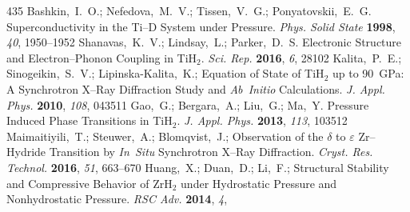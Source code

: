 \documentclass[12pt,letterpaper,oneside]{article}
\begin{document}
\begin{mcitethebibliography}{435}
{\mcitedefaultendpunct}{\mcitedefaultseppunct}\relax
\EndOfBibitem
{}
Bashkin,~I.~O.; Nefedova,~M.~V.; Tissen,~V.~G.; Ponyatovskii,~E.~G.
  Superconductivity in the Ti--D System under Pressure. \emph{Phys. Solid
  State} \textbf{1998}, \emph{40}, 1950--1952\relax
\mciteBstWouldAddEndPuncttrue
\mciteSetBstMidEndSepPunct{\mcitedefaultmidpunct}
{\mcitedefaultendpunct}{\mcitedefaultseppunct}\relax
\EndOfBibitem
{}
Shanavas,~K.~V.; Lindsay,~L.; Parker,~D.~S. Electronic Structure and
  Electron--Phonon Coupling in TiH$_2$. \emph{Sci. Rep.} \textbf{2016},
  \emph{6}, 28102\relax
\mciteBstWouldAddEndPuncttrue
\mciteSetBstMidEndSepPunct{\mcitedefaultmidpunct}
{\mcitedefaultendpunct}{\mcitedefaultseppunct}\relax
\EndOfBibitem
{}
Kalita,~P.~E.; Sinogeikin,~S.~V.; Lipinska-Kalita,~K.;
    Equation of State of TiH$_2$ up to 90~GPa: A Synchrotron
  X--Ray Diffraction Study and \emph{Ab~Initio} Calculations. \emph{J. Appl. Phys.}
  \textbf{2010}, \emph{108}, 043511\relax
\mciteBstWouldAddEndPuncttrue
\mciteSetBstMidEndSepPunct{\mcitedefaultmidpunct}
{\mcitedefaultendpunct}{\mcitedefaultseppunct}\relax
\EndOfBibitem
{}
Gao,~G.; Bergara,~A.; Liu,~G.; Ma,~Y. Pressure Induced Phase Transitions in
  TiH$_2$. \emph{J. Appl. Phys.} \textbf{2013}, \emph{113}, 103512\relax
\mciteBstWouldAddEndPuncttrue
\mciteSetBstMidEndSepPunct{\mcitedefaultmidpunct}
{\mcitedefaultendpunct}{\mcitedefaultseppunct}\relax
\EndOfBibitem
{}
Maimaitiyili,~T.; Steuwer,~A.; Blomqvist,~J.;
    Observation of the $\delta$ to $\varepsilon$ Zr--Hydride
  Transition by \emph{In~Situ} Synchrotron X--Ray Diffraction. \emph{Cryst. Res.
  Technol.} \textbf{2016}, \emph{51}, 663--670\relax
\mciteBstWouldAddEndPuncttrue
\mciteSetBstMidEndSepPunct{\mcitedefaultmidpunct}
{\mcitedefaultendpunct}{\mcitedefaultseppunct}\relax
\EndOfBibitem
{}
Huang,~X.; Duan,~D.; Li,~F.;   Structural
  Stability and Compressive Behavior of ZrH$_2$ under Hydrostatic Pressure and
  Nonhydrostatic Pressure. \emph{RSC Adv.} \textbf{2014}, \emph{4},

\end{mcitethebibliography}
\end{document}
